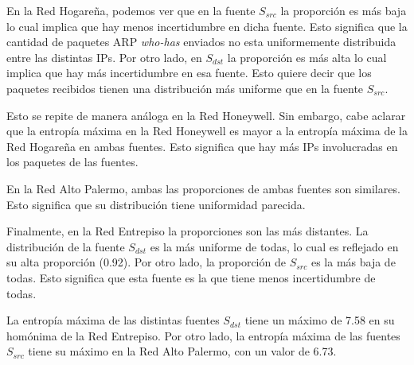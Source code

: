 En la Red Hogareña, podemos ver que en la fuente $S_{src}$ la proporción es más baja lo cual implica que hay menos incertidumbre en dicha fuente. Esto significa que la cantidad de paquetes ARP \emph{who-has} enviados no esta uniformemente distribuida entre las distintas IPs. Por otro lado, en $S_{dst}$ la proporción es más alta lo cual implica que hay más incertidumbre en esa fuente. Esto quiere decir que los paquetes recibidos tienen una distribución más uniforme que en la fuente $S_{src}$.

Esto se repite de manera análoga en la Red Honeywell. Sin embargo, cabe aclarar que la entropía máxima en la Red Honeywell es mayor a la entropía máxima de la Red Hogareña en ambas fuentes. Esto significa que hay más IPs involucradas en los paquetes de las fuentes.

En la Red Alto Palermo, ambas las proporciones de ambas fuentes son similares. Esto significa que su distribución tiene uniformidad parecida.

Finalmente, en la Red Entrepiso la proporciones son las más distantes. La distribución de la fuente $S_{dst}$ es la más uniforme de todas, lo cual es reflejado en su alta proporción (0.92). Por otro lado, la proporción de $S_{src}$ es la más baja de todas. Esto significa que esta fuente es la que tiene menos incertidumbre de todas.

La entropía máxima de las distintas fuentes $S_{dst}$ tiene un máximo de 7.58 en su homónima de la Red Entrepiso. Por otro lado, la entropía máxima de las fuentes $S_{src}$ tiene su máximo en la Red Alto Palermo, con un valor de 6.73.